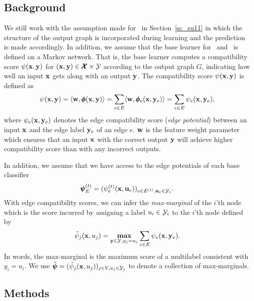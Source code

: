 {%
%
\subsection{Background}

We still work with the assumption made for \mve\ in Section~\ref{sc_su11} in which the structure of the output graph is incorporated during learning and the prediction is made accordingly.
In addition, we assume that the base learner for \amm\ and \mam\ is defined on a Markov network.
That is, the base learner computes a compatibility score $\psi(\mathbf {x},\mathbf {y})$ for $(\mathbf {x},\mathbf {y})\in\pmb {\mathcal{X}}\times\mathcal{Y}$ according to the output graph $G$, indicating how well an input $\mathbf {x}$ gets along with an output $\mathbf {y}$.
The compatibility score $\psi(\mathbf {x},\mathbf {y})$ is defined as
\begin{align*}
	\psi(\mathbf {x},\mathbf {y}) = \langle \mathbf {w}, \pmb \phi(\mathbf {x},\mathbf {y}) \rangle = \sum_{e\in E}\langle \mathbf {w}, \pmb \phi_e(\mathbf {x},\mathbf {y}_e) \rangle=\sum_{e\in E}\psi_e(\mathbf {x},\mathbf {y}_e),
\end{align*}
where $\psi_e(\mathbf {x},\mathbf {y}_e)$ denotes the edge compatibility score (\textit{edge potential}) between an input $\mathbf {x}$ and the edge label $\mathbf {y}_e$ of an edge $e$.
$\mathbf {w}$ is the feature weight parameter which ensures that an input $\mathbf {x}$ with the correct output $\mathbf {y}$ will achieve higher compatibility score than with any incorrect outputs.

In addition, we assume that we have access to the edge potentials of each base classifier 
\begin{align*}
	\pmb \psi_E^{(t)} = (\psi_e^{(t)}(\mathbf {x},\mathbf {u}_e))_{e\in E^{(t)},\mathbf {u}_e\in\mathcal{Y}_e}.
\end{align*}
With edge compatibility scores, we can infer the \textit{max-marginal} \citep{Wainwright05map} of the $i$'th node which is the score incurred by assigning a label $u_i\in\mathcal{Y}_i$ to the $i$'th node defined by
\begin{align*}
	\tilde{\psi}_j(\mathbf {x},u_j) = \underset{\mathbf {y}\in\mathcal{Y},y_j=u_j}{\textbf{max}}\sum_{e\in E}\psi_e(\mathbf {x},\mathbf {y}_e).
\end{align*}
In words, the max-marginal is the maximum score of a multilabel consistent with $y_i=u_i$.
We use $\tilde{\pmb \psi} = (\tilde{\psi}_j(\mathbf {x},u_j))_{j\in V,u_j\in\mathcal{Y}_j}$ to denote a collection of max-marginals.

\subsection{Methods}

}
